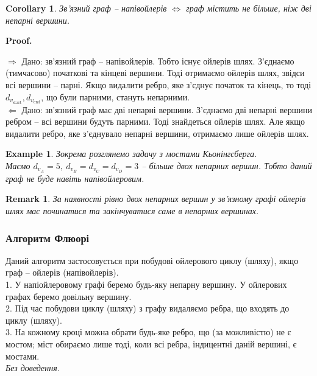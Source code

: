 \documentclass[a4paper, 14pt]{extarticle}
\makeatletter
\def\rightproof{$\boxed{\Rightarrow}$ }
\def\leftproof{$\boxed{\Leftarrow}$ }
\theoremstyle{theoremdd}
\theoremstyle{theoremdd}
\theoremstyle{theoremdd}
\theoremstyle{theoremdd}
\theoremstyle{theoremdd}
\newtheorem{example}[theorem]{Example}
\theoremstyle{theoremdd}
\theoremstyle{theoremdd}
\theoremstyle{theoremdd}
\theoremstyle{theoremdd}
\theoremstyle{theoremdd}
\theoremstyle{theoremdd}
\newtheorem{remark}[theorem]{Remark}
\theoremstyle{theoremdd}
\theoremstyle{theoremdd}
\theoremstyle{theoremdd}
\newtheorem{corollary}[theorem]{Corollary}
\theoremstyle{theoremdd}
\renewenvironment{proof}[1][Proof.\\]{\par
\pushQED{\hfill \qed}%
\normalfont \topsep6\p@\@plus6\p@\relax
\trivlist
\item\relax
{\bfseries
#1\@addpunct{.}}\hspace\labelsep\ignorespaces
}{%
\popQED\endtrivlist\@endpefalse
}
\makeatother
\begin{document}
\begin{corollary}
Зв'язний граф -- напівойлерів $\iff$ граф містить не більше, ніж дві непарні вершини.
\end{corollary}

\begin{proof}
\rightproof Дано: зв'язний граф -- напівойлерів. Тобто існує ойлерів шлях. З'єднаємо (тимчасово) початкові та кінцеві вершини. Тоді отримаємо ойлерів шлях, звідси всі вершини -- парні. Якщо видалити ребро, яке з'єднує початок та кінець, то тоді $d_{v_{\text{start}}}, d_{v_{\text{end}}}$, що були парними, стануть непарними.
\bigskip \\
\leftproof Дано: зв'язний граф має дві непарні вершини. З'єднаємо дві непарні вершини ребром -- всі вершини будуть парними. Тоді знайдеться ойлерів шлях. Але якщо видалити ребро, яке з'єднувало непарні вершини, отримаємо лише ойлерів шлях.
\end{proof}

\begin{example}
Зокрема розглянемо задачу з мостами Кьонінгсберга.\\
Маємо $d_{v_A} = 5,\ d_{v_B} = d_{v_C} = d_{v_D} = 3$ -- більше двох непарних вершин. Тобто даний граф не буде навіть напівойлеровим.
\end{example}

\begin{remark}
За наявності рівно двох непарних вершин у зв'язному графі ойлерів шлях має починатися та закінчуватися саме в непарних вершинах.
\end{remark}

\subsubsection*{Алгоритм Флюорі}
Даний алгоритм застосовується при побудові ойлерового циклу (шляху), якщо граф -- ойлерів (напівойлерів).
\bigskip \\
1. У напіойлеровому графі беремо будь-яку непарну вершину. У ойлерових графах беремо довільну вершину.\\
2. Під час побудови циклу (шляху) з графу видаляємо ребра, що входять до циклу (шляху).\\
3. На кожному кроці можна обрати будь-яке ребро, що (за можливістю) не є мостом; міст обираємо лише тоді, коли всі ребра, індицентні даній вершині, є мостами.\\
\textit{Без доведення.}
\end{document}
